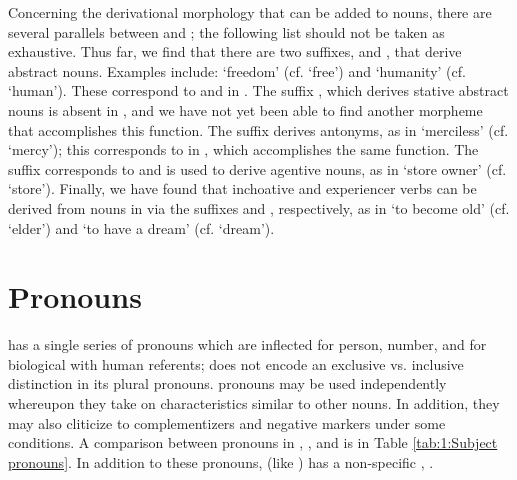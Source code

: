 \documentclass[output=paper]{../langsci/langscibook}
\begin{document}
 Concerning the derivational morphology that can be added to nouns, there are several parallels between  and ; the following list should not be taken as exhaustive. Thus far, we find that there are two  suffixes, \mbox{} and , that derive abstract nouns. Examples include:  `freedom' (cf.  `free') and  `humanity' (cf.  `human'). These correspond to \mbox{} and  in . The  suffix , which derives stative abstract nouns is absent in , and we have not yet been able to find another morpheme that accomplishes this function. The  suffix  derives antonyms, as in  `merciless' (cf.  `mercy'); this corresponds to  in , which accomplishes the same function. The  suffix  corresponds to   and is used to derive agentive nouns, as in  `store owner' (cf.  `store'). Finally, we have found that inchoative and experiencer verbs can be derived from nouns in  via the suffixes  and , respectively, as in  `to become old' (cf.  `elder') and  `to have a dream' (cf.  `dream'). 
 
 \section{Pronouns}
 
  has a single series of  pronouns which are inflected for person, number, and for biological  with human referents;  does not encode an exclusive vs. inclusive distinction in its  plural  pronouns.   pronouns may be used independently whereupon they take on characteristics similar to other nouns. In addition, they may also cliticize to complementizers and negative markers under some conditions. A comparison between  pronouns in , , and  is in Table \ref{tab:1:Subject pronouns}. In addition to these  pronouns,  (like ) has a non-specific , .
 
\end{document}
